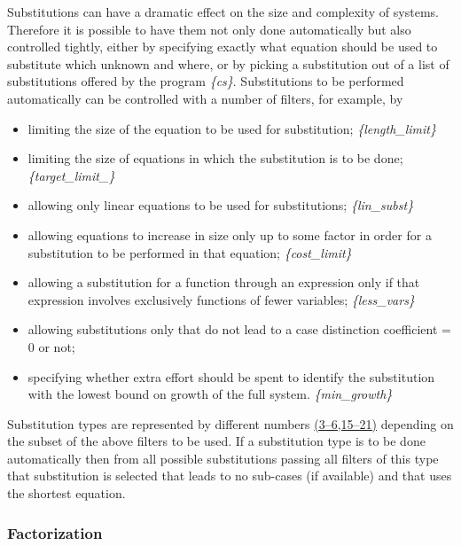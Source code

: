 Substitutions can have a dramatic effect on the size and complexity of
systems.  Therefore it is possible to have them not only done
automatically but also controlled tightly, either by specifying
exactly what equation should be used to substitute which unknown and
where, or by picking a substitution out of a list of substitutions
offered by the program \emph{\{cs\}}.  Substitutions to be performed
automatically can be controlled with a number of filters, for example,
by
\begin{itemize}
\item limiting the size of the equation to be used for substitution;
  \emph{\{length\_limit\}}
\item limiting the size of equations in which the substitution is to
  be done; \emph{\{target\_limit\_\}}
\item allowing only linear equations to be used for substitutions;
  \emph{\{lin\_subst\}}
\item allowing equations to increase in size only up to some factor in
  order for a substitution to be performed in that equation;
  \emph{\{cost\_limit\}}
\item allowing a substitution for a function through an expression
  only if that expression involves exclusively functions of fewer
  variables; \emph{\{less\_vars\}}
\item allowing substitutions only that do not lead to a case distinction
  coefficient = 0 or not;
\item specifying whether extra effort should be spent to identify the
  substitution with the lowest bound on growth of the full system.
  \emph{\{min\_growth\}}
\end{itemize}
Substitution types are represented by different numbers
\hyperlink{crack-m_3}{(3--6,15--21)} depending on the subset of the
above filters to be used.  If a substitution type is to be done
automatically then from all possible substitutions passing all filters
of this type that substitution is selected that leads to no sub-cases
(if available) and that uses the shortest equation.

\subsubsection{Factorization}

